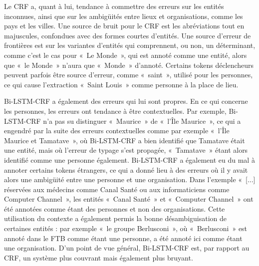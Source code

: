 \documentclass[12pt,a4paper,times,twoside,openright]{report}
\begin{document}
Le CRF a, quant à lui, tendance à commettre des erreurs sur les entités inconnues, ainsi que sur les ambigüités entre lieux et organisations, comme les pays et les villes. Une source de bruit pour le CRF est les abréviations tout en majuscules, confondues avec des formes courtes d'entités. Une source d'erreur de frontières est sur les variantes d'entités qui comprennent, ou non, un déterminant, comme c'est le cas pour «\ Le Monde\ », qui est annoté comme une entité, alors que «\ le Monde\ » n'aura que «\ Monde\ » d'annoté. Certains tokens déclencheurs peuvent parfois être source d'erreur, comme «\ saint\ », utilisé pour les personnes, ce qui cause l'extraction «\ Saint Louis\ » comme personne à la place de lieu.

Bi-LSTM-CRF a également des erreurs qui lui sont propres. En ce qui concerne les personnes, les erreurs ont tendance à être contextuelles. Par exemple, Bi-LSTM-CRF n'a pas su distinguer «\ Maurice\ » de  «\ l'Île Maurice\ », ce qui a engendré par la suite des erreurs contextuelles comme par exemple «\ l'Île Maurice et Tamatave\ », où Bi-LSTM-CRF a bien identifié que Tamatave était une entité, mais où l'erreur de typage s'est propagée, «\ Tamatave\ » étant alors identifié comme une personne également. Bi-LSTM-CRF a également eu du mal à annoter certains tokens étrangers, ce qui a donné lieu à des erreurs où il y avait alors une ambigüité entre une personne et une organisation. Dans l'exemple «\ [...] réservées aux médecins comme Canal Santé ou aux informaticiens comme Computer Channel\ », les entités «\ Canal Santé\ » et «\ Computer Channel\ » ont été annotées comme étant des personnes et non des organisations. Cette utilisation du contexte a également permis la bonne désambiguisation de certaines entités : par exemple «\ le groupe Berlusconi\ », où «\ Berlusconi\ » est annoté dans le FTB comme étant une personne, a été annoté ici comme étant une organisation. D'un point de vue général, Bi-LSTM-CRF est, par rapport au CRF, un système plus couvrant mais également plus bruyant.


    
\end{document}
